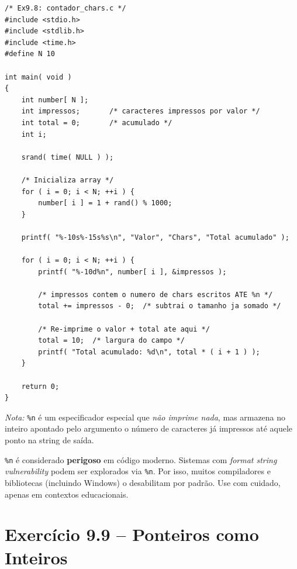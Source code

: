 \documentclass[12pt,a4paper]{article}
\begin{document}
\begin{respostabox}
\begin{lstlisting}
/* Ex9.8: contador_chars.c */
#include <stdio.h>
#include <stdlib.h>
#include <time.h>
#define N 10

int main( void )
{
    int number[ N ];
    int impressos;       /* caracteres impressos por valor */
    int total = 0;       /* acumulado */
    int i;

    srand( time( NULL ) );

    /* Inicializa array */
    for ( i = 0; i < N; ++i ) {
        number[ i ] = 1 + rand() % 1000;
    }

    printf( "%-10s%-15s%s\n", "Valor", "Chars", "Total acumulado" );

    for ( i = 0; i < N; ++i ) {
        printf( "%-10d%n", number[ i ], &impressos );

        /* impressos contem o numero de chars escritos ATE %n */
        total += impressos - 0;  /* subtrai o tamanho ja somado */

        /* Re-imprime o valor + total ate aqui */
        total = 10;  /* largura do campo */
        printf( "Total acumulado: %d\n", total * ( i + 1 ) );
    }

    return 0;
}
\end{lstlisting}

\textit{Nota:} \texttt{\%n} é um especificador especial que \textit{não imprime
nada}, mas armazena no inteiro apontado pelo argumento o número de caracteres
já impressos até aquele ponto na string de saída.

\begin{erroco}
  \texttt{\%n} é considerado \textbf{perigoso} em código moderno. Sistemas com
  \textit{format string vulnerability} podem ser explorados via \texttt{\%n}.
  Por isso, muitos compiladores e bibliotecas (incluindo Windows) o desabilitam
  por padrão. Use com cuidado, apenas em contextos educacionais.
\end{erroco}
\end{respostabox}

\newpage

\section{Exercício 9.9 -- Ponteiros como Inteiros}
\end{document}
